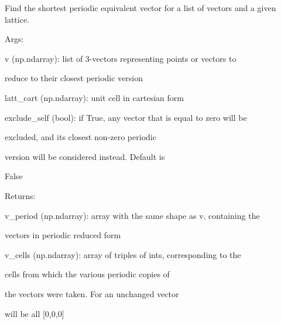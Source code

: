 \documentclass[letterpaper,10pt,english]{sphinxmanual}
\begin{document}
\begin{fulllineitems}
\label{doctree/soprano.utils:soprano.utils.minimum_periodic}
Find the shortest periodic equivalent vector for a list of vectors and a
given lattice.

\begin{DUlineblock}{0em}
\item[] Args:
\item[]
\begin{DUlineblock}{\DUlineblockindent}
\item[] v (np.ndarray): list of 3-vectors representing points or vectors to
\item[]
\begin{DUlineblock}{\DUlineblockindent}
\item[] reduce to their closest periodic version
\end{DUlineblock}
\item[] latt\_cart (np.ndarray): unit cell in cartesian form
\item[] exclude\_self (bool): if True, any vector that is equal to zero will be
\item[]
\begin{DUlineblock}{\DUlineblockindent}
\item[] excluded, and its closest non-zero periodic
\item[] version will be considered instead. Default is
\item[] False
\end{DUlineblock}
\end{DUlineblock}
\end{DUlineblock}

\begin{DUlineblock}{0em}
\item[] Returns:
\item[]
\begin{DUlineblock}{\DUlineblockindent}
\item[] v\_period (np.ndarray): array with the same shape as v, containing the
\item[]
\begin{DUlineblock}{\DUlineblockindent}
\item[] vectors in periodic reduced form
\end{DUlineblock}
\item[] v\_cells (np.ndarray): array of triples of ints, corresponding to the
\item[]
\begin{DUlineblock}{\DUlineblockindent}
\item[] cells from which the various periodic copies of
\item[] the vectors were taken. For an unchanged vector
\item[] will be all {[}0,0,0{]}
\end{DUlineblock}
\end{DUlineblock}
\end{DUlineblock}

\end{fulllineitems}
\end{document}
